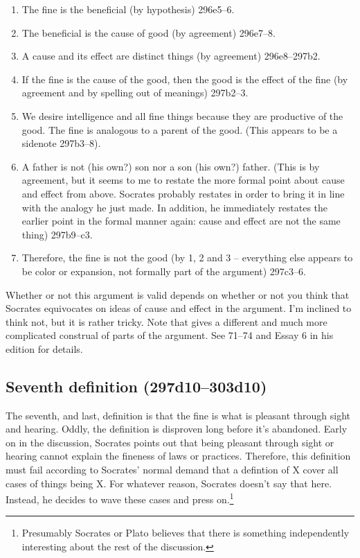 \documentclass[12pt]{article}
\begin{document}
\begin{enumerate}
    \item The fine is the beneficial (by hypothesis) 296e5--6.
    \item The beneficial is the cause of good (by agreement) 296e7--8.
    \item A cause and its effect are distinct things (by agreement) 296e8--297b2.
    \item If the fine is the cause of the good, then the good is the effect of the fine (by agreement and by spelling out of meanings) 297b2--3.
    \item We desire intelligence and all fine things because they are productive of the good.  The fine is analogous to a parent of the good. (This appears to be a sidenote 297b3--8).
    \item A father is not (his own?) son nor a son (his own?) father. (This is by agreement, but it seems to me to restate the more formal point about cause and effect from above.  Socrates probably restates in order to bring it in line with the analogy he just made.  In addition, he immediately restates the earlier point in the formal manner again: cause and effect are not the same thing) 297b9--c3.
    \item Therefore, the fine is not the good (by 1, 2 and 3 -- everything else appears to be color or expansion, not formally part of the argument) 297c3--6.
\end{enumerate}

Whether or not this argument is valid depends on whether or not you think that Socrates equivocates on ideas of cause and effect in the argument.  I'm inclined to think not, but it is rather tricky.  Note that \citet{woodruff1982} gives a different and much more complicated construal of parts of the argument.  See 71--74 and Essay {6} in his edition for details.


\subsection{Seventh definition (297d10--303d10)}

The seventh, and last, definition is that the fine is what is pleasant through sight and hearing.  Oddly, the definition is disproven long before it's abandoned.  Early on in the discussion, Socrates points out that being pleasant through sight or hearing cannot explain the fineness of laws or practices.  Therefore, this definition must fail according to Socrates' normal demand that a defintion of X cover all cases of things being X.  For whatever reason, Socrates doesn't say that here.  Instead, he decides to wave these cases and press on.\footnote{Presumably Socrates or Plato believes that there is something independently interesting about the rest of the discussion.}
\end{document}

